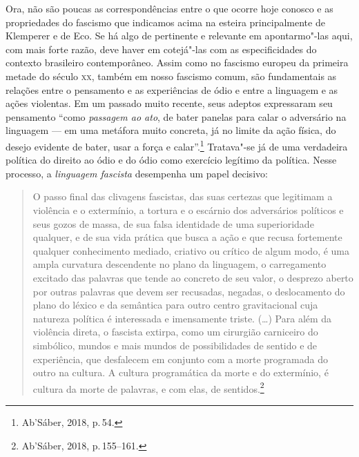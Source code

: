Ora, não são poucas as correspondências entre o que ocorre hoje conosco
e as propriedades do fascismo que indicamos acima na esteira
principalmente de Klemperer e de Eco. Se há algo de pertinente e
relevante em apontarmo"-las aqui, com mais forte razão, deve haver em
cotejá"-las com as especificidades do contexto brasileiro contemporâneo.
Assim como no fascismo europeu da primeira metade do século \textsc{xx}, também
em nosso fascismo comum, são fundamentais as relações entre o pensamento
e as experiências de ódio e entre a linguagem e as ações violentas. Em
um passado muito recente, seus adeptos expressaram seu pensamento ``como
\emph{passagem ao ato}, de bater panelas para calar o adversário na
linguagem --- em uma metáfora muito concreta, já no limite da ação
física, do desejo evidente de bater, usar a força e calar''.\footnote{Ab'Sáber,
  2018, p.\,54.} Tratava"-se já de uma verdadeira política do direito ao
ódio e do ódio como exercício legítimo da política. Nesse processo, a
\emph{linguagem fascista} desempenha um papel decisivo:

\begin{quote}
O passo final das clivagens fascistas, das suas certezas que legitimam a
violência e o extermínio, a tortura e o escárnio dos adversários
políticos e seus gozos de massa, de sua falsa identidade de uma
superioridade qualquer, e de sua vida prática que busca a ação e que
recusa fortemente qualquer conhecimento mediado, criativo ou crítico de
algum modo, é uma ampla curvatura descendente no plano da linguagem, o
carregamento excitado das palavras que tende ao concreto de seu valor, o
desprezo aberto por outras palavras que devem ser recusadas, negadas, o
deslocamento do plano do léxico e da semântica para outro centro
gravitacional cuja natureza política é interessada e imensamente triste.
(\ldots{}) Para além da violência direta, o fascista extirpa, como um
cirurgião carniceiro do simbólico, mundos e mais mundos de
possibilidades de sentido e de experiência, que desfalecem em conjunto
com a morte programada do outro na cultura. A cultura programática da
morte e do extermínio, é cultura da morte de palavras, e com elas, de
sentidos.\footnote{Ab'Sáber, 2018, p.\,155--161.}
\end{quote}


